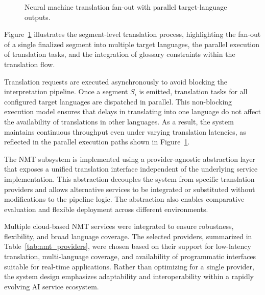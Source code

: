 \begin{figure}[!htbp]
  \centering
  
  \caption[Segment-level NMT fan-out with parallel target-language outputs]{Neural machine translation fan-out with parallel target-language outputs.}
  \label{fig:nmt_flow}
\end{figure}

Figure~\ref{fig:nmt_flow} illustrates the segment-level translation process, highlighting the fan-out of a single finalized segment into multiple target languages, the parallel execution of translation tasks, and the integration of glossary constraints within the translation flow.

Translation requests are executed asynchronously to avoid blocking the interpretation pipeline. Once a segment $S_i$ is emitted, translation tasks for all configured target languages are dispatched in parallel. This non-blocking execution model ensures that delays in translating into one language do not affect the availability of translations in other languages. As a result, the system maintains continuous throughput even under varying translation latencies, as reflected in the parallel execution paths shown in Figure~\ref{fig:nmt_flow}.

The NMT subsystem is implemented using a provider-agnostic abstraction layer that exposes a unified translation interface independent of the underlying service implementation. This abstraction decouples the system from specific translation providers and allows alternative services to be integrated or substituted without modifications to the pipeline logic. The abstraction also enables comparative evaluation and flexible deployment across different environments.

Multiple cloud-based NMT services were integrated to ensure robustness, flexibility, and broad language coverage. The selected providers, summarized in Table~\ref{tab:nmt_providers}, were chosen based on their support for low-latency translation, multi-language coverage, and availability of programmatic interfaces suitable for real-time applications. Rather than optimizing for a single provider, the system design emphasizes adaptability and interoperability within a rapidly evolving AI service ecosystem.

